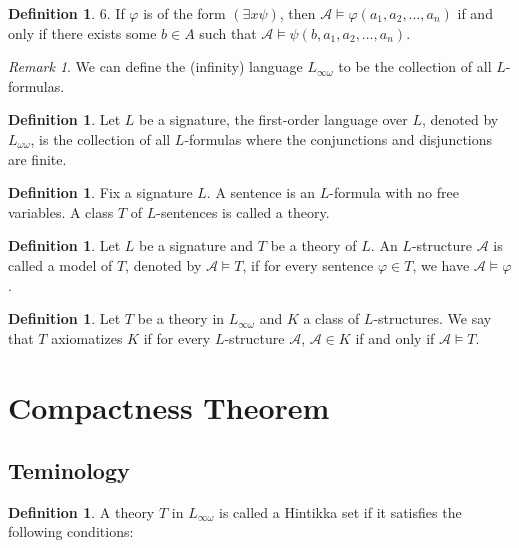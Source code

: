 \documentclass[12pt, reqno]{amsart}
\theoremstyle{definition}
\newtheorem{definition}[theorem]{Definition}
\theoremstyle{remark}
\newtheorem{remark}[theorem]{Remark}
\numberwithin{equation}{section}
\begin{document}
{\begin{definition}
    6. If $\varphi$ is of the form $(\exists x \psi)$, then $\mathcal{A} \models \varphi(a_1, a_2, \ldots, a_n)$ if and only if there exists some $b \in A$ such that $\mathcal{A} \models \psi(b, a_1, a_2, \ldots, a_n)$.
\end{definition}

\begin{remark}
    We can define the (infinity) language $L_{\infty \omega}$ to be the collection of all $L$-formulas.
\end{remark}

\begin{definition}
    Let $L$ be a signature, the first-order language over $L$, denoted by $L_{\omega \omega}$, is the collection of all $L$-formulas where the conjunctions and disjunctions are finite.
\end{definition}

\begin{definition}
    Fix a signature $L$. A sentence is an $L$-formula with no free variables. A class $T$ of $L$-sentences is called a theory.
\end{definition}

\begin{definition}
    Let $L$ be a signature and $T$ be a theory of $L$. An $L$-structure $\mathcal{A}$ is called a model of $T$, denoted by $\mathcal{A} \models T$, if for every sentence $\varphi \in T$, we have $\mathcal{A} \models \varphi$.
\end{definition}

\begin{definition}
    Let $T$ be a theory in $L_{\infty \omega}$ and $K$ a class of $L$-structures. We say that $T$ axiomatizes $K$ if for every $L$-structure $\mathcal{A}$, $\mathcal{A} \in K$ if and only if $\mathcal{A} \models T$.
\end{definition}

\section{Compactness Theorem}

\subsection{Teminology}

\begin{definition}
    A theory $T$ in $L_{\infty \omega}$ is called a Hintikka set if it satisfies the following conditions:


\end{definition}}
\end{document}

